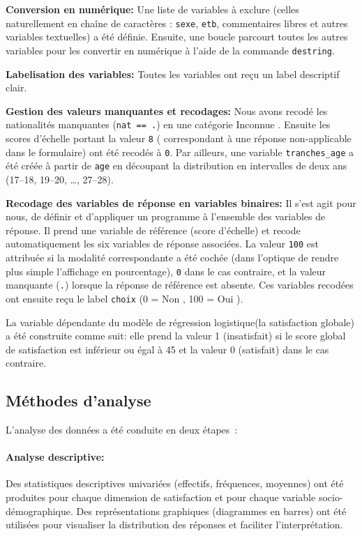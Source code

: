 \documentclass[
12pt,          %
a4paper,       %
oneside,      %
openright      %
]{report}          %
\begin{document}
		\textbf{Conversion en numérique:}
		Une liste de variables à exclure (celles naturellement en chaîne de caractères :
		\texttt{sexe}, \texttt{etb}, commentaires libres et autres variables textuelles)
		a été définie. Ensuite, une boucle parcourt toutes les autres variables pour les convertir
		en numérique à l'aide de la commande \texttt{destring}.
		
		\textbf{Labelisation des variables:}
		Toutes les variables ont reçu un label descriptif clair.
		
		\textbf{Gestion des valeurs manquantes et recodages:}
		Nous avons recodé les nationalités manquantes (\texttt{nat == .}) en une catégorie
		\og Inconnue \fg{}. Ensuite les scores d'échelle portant la valeur \texttt{8} ( correspondant
		à une réponse non-applicable dans le formulaire) ont été recodés à \texttt{0}.
		Par ailleurs, une variable \texttt{tranches\_age} a été créée à partir de \texttt{age}
		en découpant la distribution en intervalles de deux ans (17--18, 19--20, \ldots, 27--28).
		
		\textbf{Recodage des variables de réponse en variables binaires:}
		Il s'est agit pour nous, de définir et d'appliquer un programme à l'ensemble des variables de réponse.
		Il prend une variable de référence (score d'échelle) et recode automatiquement les six
		variables de réponse associées. La valeur \texttt{100} est attribuée si la modalité
		correspondante a été cochée (dans l'optique de rendre plus simple l'affichage en pourcentage), \texttt{0} dans le cas contraire, et la valeur manquante
		(\texttt{.}) lorsque la réponse de référence est absente. Ces variables recodées ont
		ensuite reçu le label \texttt{choix} (0 = \og Non \fg{}, 100 = \og Oui \fg{}).
		
		La variable dépendante du modèle de régression logistique(la satisfaction globale)
		a été construite comme suit: elle prend la valeur 1 (insatisfait) si le score global de
		satisfaction est inférieur ou égal à 45 et la valeur 0 (satisfait) dans le cas contraire.
		
		\subsection{Méthodes d'analyse}
		
			L'analyse des données a été conduite en deux étapes~:
			
			\paragraph{Analyse descriptive:} Des statistiques descriptives univariées (effectifs,
			fréquences, moyennes) ont été produites pour chaque dimension de satisfaction et pour
			chaque variable socio-démographique. Des représentations graphiques (diagrammes en barres)
			ont été utilisées pour visualiser la distribution des réponses et faciliter l'interprétation.
			
\end{document}
